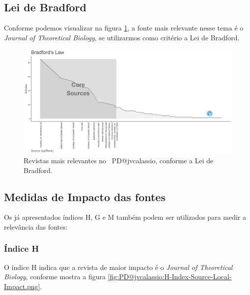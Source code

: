 \subsection{Lei de Bradford}

Conforme podemos visualizar na figura \ref{fig:PD@jvcalassio:Bradfords-Law.png}, a fonte mais relevante nesse tema é o \textit{Journal of Theoretical Biology}, se utilizarmos como critério a Lei de Bradford.

\begin{figure}
    \centering
    \includegraphics[width=1\textwidth]{exploratory-data-analysis/jvcalassio/PesqBibliogr/PrisonersDilemma/WoS-20221201/Dataset/BradfordLaws-2022-12-03.png}
    \caption{Revistas mais relevantes no  \dataset\ PD@jvcalassio, conforme a Lei de Bradford.}
    \label{fig:PD@jvcalassio:Bradfords-Law.png}
\end{figure}

\subsection{Medidas de Impacto das fontes}

Os já apresentados índices H, G e M também podem ser utilizados para medir a relevância das fontes:

\subsubsection{Índice H}

O índice H indica que a revista de maior impacto é o \textit{Journal of Theoretical Biology}, conforme mostra a figura \ref{fig:PD@jvcalassio:H-Index-Source-Local-Impact.png}.

